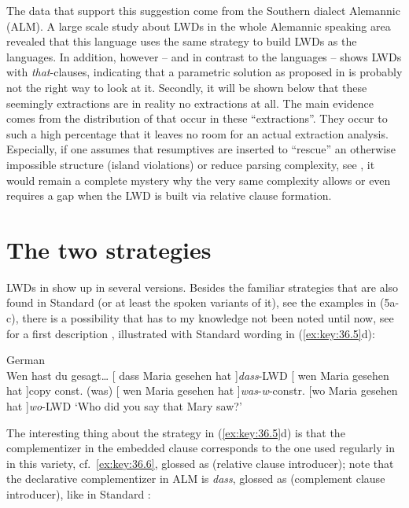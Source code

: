 \documentclass[output=paper]{langsci/langscibook}
\begin{document}
The data that support this suggestion come from the Southern  dialect
Alemannic (ALM). A large scale study about \glspl{LWD} in the whole Alemannic
speaking area revealed that this language uses the same strategy to build
\glspl{LWD} as the  languages. In addition, however -- and in contrast
to the  languages --  shows \glspl{LWD} with
\emph{that}-clauses, indicating that a parametric solution as proposed in
\citet{AdgRam2005} is probably not the right way to look at it. Secondly, it
will be shown below that these seemingly extractions are in reality no
extractions at all. The main evidence comes from the distribution of
 that occur in these “extractions”. They occur to such
a high percentage that it leaves no room for an actual extraction analysis.
Especially, if one assumes that resumptives are
inserted to \enquote{rescue} an otherwise impossible structure
(island
violations) or reduce parsing complexity, see \citet{ChaoSells1983}, it would
remain a complete mystery why the very same complexity allows or even requires
a gap when the \gls{LWD} is built via relative clause formation.

\section{The two strategies}\label{sec:36.2} %

\glspl{LWD} in  show up in several versions. Besides the
familiar strategies that are also found in Standard  (or at least
the spoken variants of it), see the examples in (5a-c), there is a possibility
that has to my knowledge not been noted until now, see for a first description
\textcite{BrandnerBucheli2018}, illustrated with Standard  wording
in (\ref{ex:key:36.5}d):

\ea\label{ex:key:36.5}German\\
    Wen hast du gesagt\dots{}
    \ea {}[ dass Maria \underline{\hphantom{2em}} gesehen hat ]\hfill \emph{dass}-\gls{LWD}
    \ex {}[ wen Maria\underline{\hphantom{2em}} gesehen hat ]\hfill copy const.
    \ex (was) [ wen Maria \underline{\hphantom{2em}} gesehen hat ]\hfill \emph{was}-\emph{w}-constr.
    \ex {}[wo Maria \underline{\hphantom{2em}} gesehen hat ]\hfill \emph{wo}-\gls{LWD}
    \sn \enquote*{Who did you say that Mary saw?}
    \z
\z

The interesting thing about the strategy in (\ref{ex:key:36.5}d) is that the
complementizer in the embedded clause corresponds to the
one used regularly in  in this variety, cf.\
\eqref{ex:key:36.6}, glossed as \Rci{} (relative clause introducer); note that
the declarative complementizer\is{complementizers} in ALM is \emph{dass},
glossed as \Cci{} (complement clause introducer), like in Standard
\ili{German}:
\end{document}
